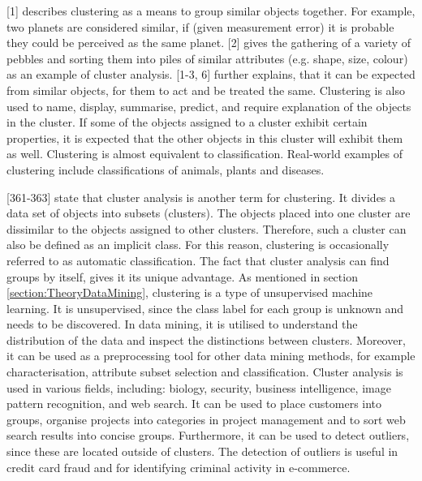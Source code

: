 

\textcite{hartigan1975clustering}[1] describes clustering as a means to group similar objects together. For example, two planets are considered similar, if (given measurement error) it is probable they could be perceived as the same planet. \textcite{romesburg2004cluster}[2] gives the gathering of a variety of pebbles and sorting them into piles of similar attributes (e.g. shape, size, colour) as an example of cluster analysis. \textcite{hartigan1975clustering}[1-3, 6] further explains, that it can be expected from similar objects, for them to act and be treated the same. Clustering is also used to name, display, summarise, predict, and require explanation of the objects in the cluster. If some of the objects assigned to a cluster exhibit certain properties, it is expected that the other objects in this cluster will exhibit them as well. Clustering is almost equivalent to classification. Real-world examples of clustering include classifications of animals, plants and diseases.

\textcite{han2011data}[361-363] state that cluster analysis is another term for clustering. It divides a data set of objects into subsets (clusters). The objects placed into one cluster are dissimilar to the objects assigned to other clusters. Therefore, such a cluster can also be defined as an implicit class. For this reason, clustering is occasionally referred to as automatic classification. The fact that cluster analysis can find groups by itself, gives it its unique advantage. As mentioned in section \ref{section:TheoryDataMining}, clustering is a type of unsupervised machine learning. It is unsupervised, since the class label for each group is unknown and needs to be discovered. In data mining, it is utilised to understand the distribution of the data and inspect the distinctions between clusters. Moreover, it can be used as a preprocessing tool for other data mining methods, for example characterisation, attribute subset selection and classification.
Cluster analysis is used in various fields, including: biology, security, business intelligence, image pattern recognition, and web search. It can be used to place customers into groups, organise projects into categories in project management and to sort web search results into concise groups. Furthermore, it can be used to detect outliers, since these are located outside of clusters. The detection of outliers is useful in credit card fraud and for identifying criminal activity in e-commerce. 


